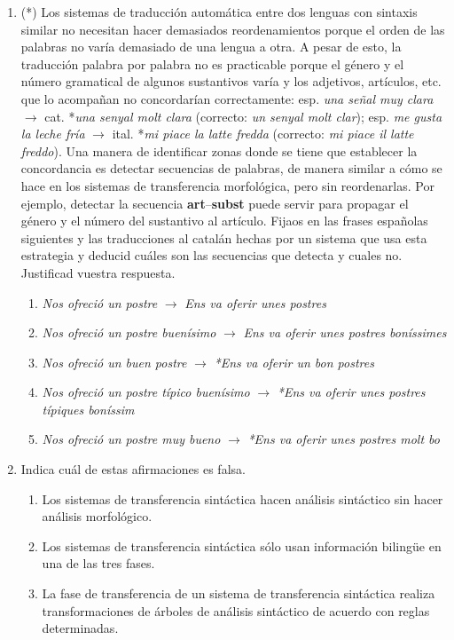 \begin{enumerate}
\item (*) \label{ex:postres} Los sistemas de traducción automática entre dos lenguas con sintaxis similar no necesitan hacer demasiados reordenamientos porque el orden de las palabras no varía demasiado de una lengua a otra. A pesar de esto, la traducción palabra por palabra no es practicable porque el género y el número gramatical de algunos sustantivos varía y los adjetivos, artículos, etc. que lo acompañan no concordarían correctamente: esp. {\em una señal muy clara\/} $\rightarrow$ cat. *{\em una senyal molt clara} (correcto: {\em un senyal molt clar\/}); esp. {\em me gusta la leche fría} $\rightarrow$ ital. *{\em mi piace la latte fredda\/} (correcto: {\em mi piace il latte freddo}). Una manera de identificar zonas donde se tiene que establecer la concordancia es detectar secuencias de palabras, de manera similar a cómo se hace en los sistemas de transferencia morfológica, pero sin reordenarlas. Por ejemplo, detectar la secuencia {\bf art}--{\bf subst} puede servir para propagar el género y el número del sustantivo al artículo. Fijaos en las frases españolas siguientes y las traducciones al catalán hechas por un sistema que usa esta estrategia y deducid cuáles son las secuencias que detecta y cuales no. Justificad vuestra respuesta. \begin{enumerate} \item \emph{Nos ofreció un postre} $\rightarrow$ \emph{Ens va oferir unes postres\/} \item \emph{Nos ofreció un postre buenísimo} $\rightarrow$ \emph{Ens va oferir unes postres boníssimes\/} \item \emph{Nos ofreció un buen postre} $\rightarrow$ \emph{*Ens va oferir un bon postres\/} \item \emph{Nos ofreció un postre típico buenísimo\/} $\rightarrow$ \emph{*Ens va oferir unes postres típiques boníssim\/} \item \emph{Nos ofreció un postre muy bueno} $\rightarrow$ \emph{*Ens va oferir unes postres molt bo\/} \end{enumerate} 

\item Indica cuál de estas afirmaciones es falsa. \begin{enumerate} \item Los sistemas de transferencia sintáctica hacen análisis sintáctico sin hacer análisis morfológico. \item Los sistemas de transferencia sintáctica sólo usan información bilingüe en una de las tres fases. \item La fase de transferencia de un sistema de transferencia sintáctica realiza transformaciones de árboles de análisis sintáctico de acuerdo con reglas determinadas. \end{enumerate} 


\end{enumerate}
